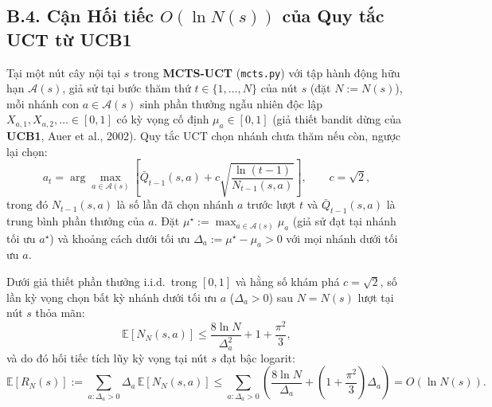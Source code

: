 \subsection{B.4. Cận Hối tiếc $O(\ln N(s))$ của Quy tắc UCT từ UCB1}
\label{subsec:b4-uct}

Tại một nút cây nội tại $s$ trong \textbf{MCTS-UCT} (\texttt{mcts.py}) với tập hành động hữu hạn $\mathcal{A}(s)$, giả sử tại bước thăm thứ $t \in \{1, \dots, N\}$ của nút $s$ (đặt $N := N(s)$), mỗi nhánh con $a \in \mathcal{A}(s)$ sinh phần thưởng ngẫu nhiên độc lập $X_{a,1}, X_{a,2}, \dots \in [0, 1]$ có kỳ vọng cố định $\mu_a \in [0, 1]$ (giả thiết bandit dừng của \textbf{UCB1}, Auer et al., 2002). Quy tắc UCT chọn nhánh chưa thăm nếu còn, ngược lại chọn:
\[
  a_t = \arg\max_{a \in \mathcal{A}(s)} \left[ \bar{Q}_{t-1}(s, a) + c \sqrt{\frac{\ln (t - 1)}{N_{t-1}(s, a)}} \right], \qquad c = \sqrt{2},
\]
trong đó $N_{t-1}(s, a)$ là số lần đã chọn nhánh $a$ trước lượt $t$ và $\bar{Q}_{t-1}(s, a)$ là trung bình phần thưởng của $a$. Đặt $\mu^\star := \max_{a \in \mathcal{A}(s)} \mu_a$ (giả sử đạt tại nhánh tối ưu $a^\star$) và khoảng cách dưới tối ưu $\Delta_a := \mu^\star - \mu_a > 0$ với mọi nhánh dưới tối ưu $a$.

\begin{theorem}
\label{thm:b4-uct}
Dưới giả thiết phần thưởng i.i.d.\ trong $[0, 1]$ và hằng số khám phá $c = \sqrt{2}$, số lần kỳ vọng chọn bất kỳ nhánh dưới tối ưu $a$ ($\Delta_a > 0$) sau $N = N(s)$ lượt tại nút $s$ thỏa mãn:
\begin{equation}
  \mathbb{E}[N_N(s, a)] \le \frac{8 \ln N}{\Delta_a^2} + 1 + \frac{\pi^2}{3},
  \label{eq:b4-pulls}
\end{equation}
và do đó hối tiếc tích lũy kỳ vọng tại nút $s$ đạt bậc logarit:
\begin{equation}
  \mathbb{E}[R_N(s)] := \sum_{a : \Delta_a > 0} \Delta_a \, \mathbb{E}[N_N(s, a)] \le \sum_{a : \Delta_a > 0} \left( \frac{8 \ln N}{\Delta_a} + \left(1 + \frac{\pi^2}{3}\right)\Delta_a \right) = O(\ln N(s)).
  \label{eq:b4-regret}
\end{equation}
\end{theorem}

